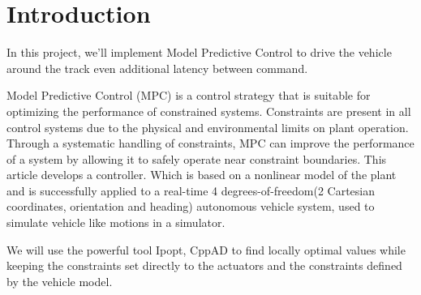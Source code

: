 \section{Introduction}

In this project, we'll implement Model Predictive Control to drive the
vehicle around the track even additional latency between command.

Model Predictive Control (MPC) is a control strategy that is suitable for optimizing the performance of constrained systems. Constraints are present in all control systems due to the physical and environmental limits on plant operation. Through a systematic handling of constraints, MPC can improve the performance of a system by allowing it to safely operate near constraint boundaries. This article develops a controller. Which is based on a nonlinear model of the plant and is successfully applied to a real-time 4 degrees-of-freedom(2 Cartesian coordinates, orientation and heading) autonomous vehicle system, used to simulate vehicle like motions in a simulator.

We will use the powerful tool Ipopt, CppAD to find locally optimal values while keeping the constraints set directly to the actuators and the constraints defined by the vehicle model.
